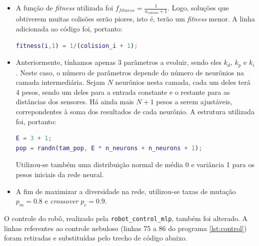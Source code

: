 	\begin{itemize}
	  \item A função de \textit{fitness} utilizada foi
	  \(f_{fitness}=\frac{1}{n_{colisao} + 1}\). Logo, soluções que obtiverem
	  muitas colisões serão piores, isto é, terão um \textit{fitness} menor. A
	  linha adicionada ao código foi, portanto:
	  
\begin{lstlisting}[language=Matlab, style=nonumbers]
fitness(i,1) = 1/(colision_i + 1);
\end{lstlisting}
	
	  \item  Anteriormente, tínhamos apenas 3 parâmetros a evoluir, sendo eles
	  \(k_d\), \(k_p\) e \(k_i\). Neste caso, o número de parâmetros depende do
	  número de neurônios na camada intermediária. Sejam \(N\) neurônios nesta
	  camada, cada um deles terá 4 pesos, sendo um deles para a entrada constante e
	  o restante para as distâncias dos sensores. Há ainda mais \(N + 1\) pesos a
	  serem ajustáveis, correpondentes à soma dos resultados de cada neurônio. A
	  estrutura utilizada foi, portanto:
	  
\begin{lstlisting}[language=Matlab, style=nonumbers]
% Numero de entradas: d1, d2, d3 e termo constante
E = 3 + 1;
pop = randn(tam_pop, E * n_neurons + n_neurons + 1);
\end{lstlisting}	  
	
	  Utilizou-se também uma distribuição normal de média 0 e variância 1 para os
	  pesos iniciais da rede neural.
	  
	  \item A fim de maximizar a diversidade na rede, utilizou-se taxas de mutação
	  \(p_m = 0.8\) e \textit{crossover} \(p_c = 0.9\).

	\end{itemize}
	
	O controle do robô, realizado pela \texttt{robot\_control\_mlp}, também foi
	alterado. A linhas referentes ao controle nebuloso (linhas 75 a 86 do programa
	\ref{lst:control}) foram retiradas e substituídas pelo trecho de código abaixo.
	
